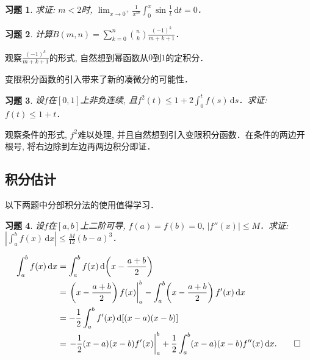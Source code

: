 \documentclass[11pt,a4paper]{ctexart}
\makeatletter
\theoremstyle{thmseries} %
\theoremstyle{exerseries}
\newtheorem{exer}{习题}[section]
\renewenvironment{proof}[1][\proofname]{\par
  \pushQED{\qed}%
  \normalfont \topsep6\p@\@plus6\p@\relax
  \trivlist
  \item[\hskip\labelsep
        \itshape
    #1\@addpunct{}]\ignorespaces
}{%
  \popQED\endtrivlist\@endpefalse
}
\newenvironment{sol}{\begin{proof}[\bfseries\upshape 解\quad]}{\end{proof}}
\newenvironment{pf}{\begin{proof}[\bfseries\upshape 证\quad]}{\end{proof}}
\newcommand{\bra}[1]{\mathopen{}\left(#1\right)}
\renewcommand{\d}{\mathrm{d}}
\makeatother
\begin{document}
\begin{exer}
	求证: $m<2$时, $\lim_{x\to0^+}\frac{1}{x^m}\int_{0}^{x}\sin\frac{1}{t}\,\d t=0$．
\end{exer}

\begin{exer}
	计算$B(m,n)=\sum_{k=0}^{n}\binom{n}{k}\frac{(-1)^k}{m+k+1}$．
\end{exer}
\begin{sol}
	观察$\frac{(-1)^k}{m+k+1}$的形式, 自然想到幂函数从$0$到$1$的定积分．
\end{sol}

变限积分函数的引入带来了新的凑微分的可能性．
\begin{exer}
	设$f$在$[0,1]$上非负连续, 且$f^2(t)\leq1+2\int_{0}^{t}f(s)\,\d s$．求证: $f(t)\leq1+t$．
\end{exer}
\begin{pf}
	观察条件的形式, $f^2$难以处理, 并且自然想到引入变限积分函数．在条件的两边开根号, 将右边除到左边再两边积分即证．
\end{pf}


\subsection{积分估计}
以下两题中分部积分法的使用值得学习．
\begin{exer}
	设$f$在$[a,b]$上二阶可导, $f(a)=f(b)=0,\,|f''(x)|\leq M$．求证: $\left|\int_{a}^{b}f(x)\,\d x\right|\leq\frac{M}{12}(b-a)^3$．	
\end{exer}
\begin{pf}
	\begin{align*}
		\int_{a}^{b}f(x)\,\d x&=\int_{a}^{b}f(x)\,\d\bra{x-\frac{a+b}{2}}\\
		&=\left.\bra{x-\frac{a+b}{2}}f(x)\right|_a^b-\int_{a}^{b}\bra{x-\frac{a+b}{2}}f'(x)\,\d x\\
		&=-\frac{1}{2}\int_{a}^{b}f'(x)\,\d[(x-a)(x-b)]\\
		&=\left.-\frac{1}{2}(x-a)(x-b)f'(x)\right|_a^b+\frac{1}{2}\int_{a}^{b}(x-a)(x-b)f''(x)\,\d x.\qedhere
	\end{align*}
\end{pf}

\end{document}
